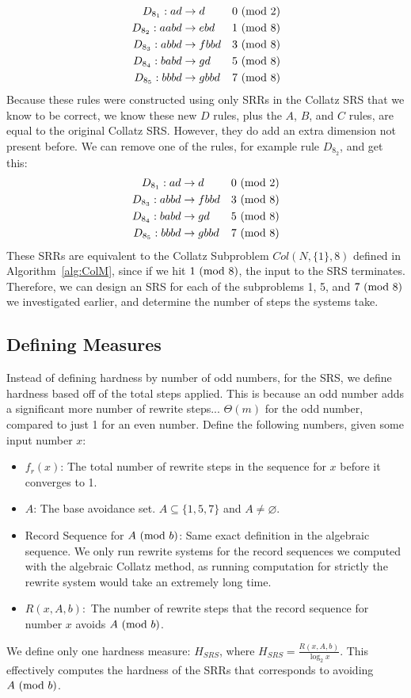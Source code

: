 \begin{align*}
    D_{8_1}: ad &\rightarrow d &\text{$0\ (\mathrm{mod}\ 2)$}\\
    D_{8_2}: aabd &\rightarrow ebd &\text{$1\ (\mathrm{mod}\ 8)$}\\
    D_{8_3}: abbd &\rightarrow fbbd &\text{$3\ (\mathrm{mod}\ 8)$}\\
    D_{8_4}: babd &\rightarrow gd &\text{$5\ (\mathrm{mod}\ 8)$}\\
    D_{8_5}: bbbd &\rightarrow gbbd &\text{$7\ (\mathrm{mod}\ 8)$}
\end{align*}
Because these rules were constructed using only SRRs in the Collatz SRS that we know to be correct, we know these new $D$ rules, plus the $A$, $B$, and $C$ rules, are equal to the original Collatz SRS. However, they do add an extra dimension not present before. We can remove one of the rules, for example rule $D_{8_2}$, and get this:
\begin{align*}
    D_{8_1}: ad &\rightarrow d &\text{$0\ (\mathrm{mod}\ 2)$}\\
    D_{8_3}: abbd &\rightarrow fbbd &\text{$3\ (\mathrm{mod}\ 8)$}\\
    D_{8_4}: babd &\rightarrow gd &\text{$5\ (\mathrm{mod}\ 8)$}\\
    D_{8_5}: bbbd &\rightarrow gbbd &\text{$7\ (\mathrm{mod}\ 8)$}
\end{align*}
These SRRs are equivalent to the Collatz Subproblem $Col(N,\{1\},8)$ defined in Algorithm~\ref{alg:ColM}, since if we hit $1 \ (\mathrm{mod}\ 8)$, the input to the SRS terminates. Therefore, we can design an SRS for each of the subproblems 1, 5, and $7 \ (\mathrm{mod}\ 8)$ we investigated earlier, and determine the number of steps the systems take.

\subsection{Defining Measures} \label{subsec:rewritemeasuredefs}
Instead of defining hardness by number of odd numbers, for the SRS, we define hardness based off of the total steps applied. This is because an odd number adds a significant more number of rewrite steps... $\Theta(m)$ for the odd number, compared to just 1 for an even number. Define the following numbers, given some input number $x$:
\begin{itemize}
    \item $f_r(x)$: The total number of rewrite steps in the sequence for $x$ before it converges to 1.
    \item $A$: The base avoidance set. $A \subseteq \{1, 5, 7\}$ and $A \ne \varnothing$.
    \item Record Sequence for $A \ (\mathrm{mod}\ b)$: Same exact definition in the algebraic sequence. We only run rewrite systems for the record sequences we computed with the algebraic Collatz method, as running computation for strictly the rewrite system would take an extremely long time.
    \item $R(x, A, b):$ The number of rewrite steps that the record sequence for number $x$ avoids $A \ (\mathrm{mod}\ b)$. 
\end{itemize}
We define only one hardness measure: $H_{SRS}$, where $H_{SRS} = \frac{R(x, A, b)}{\log_2{x}}$. This effectively computes the hardness of the SRRs that corresponds to avoiding $A \ (\mathrm{mod}\ b)$.

